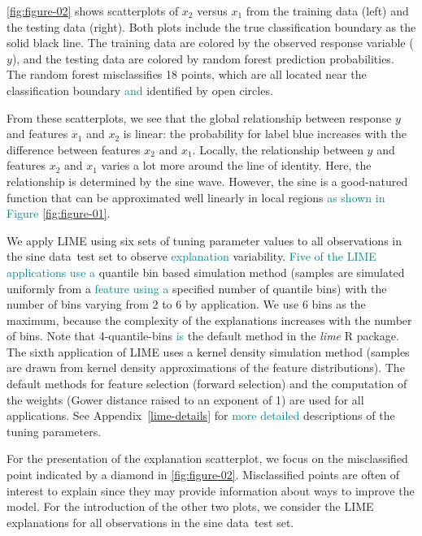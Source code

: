 \documentclass[AMS,STIX2COL]{WileyNJD-v2}\usepackage[]{graphicx}\usepackage[]{color}
\newcommand{\kge}[1]{\textcolor{teal}{#1}}
\newcommand{\data}{sine data}
\renewcommand{\sout}[1]{\unskip}
\begin{document}
\autoref{fig:figure-02} shows scatterplots of $x_2$ versus $x_1$ from the training data (left) and the testing data (right). Both plots include the true classification boundary \sout{of the rotated sine function plotted} as the solid black line. The training data are colored by the observed response variable ($y$), and the testing data are colored by random forest prediction probabilities. The random forest  misclassifies 18 points, which are all located near the classification boundary \sout{. These are} \kge{and} identified by open circles\sout{ in \autoref{fig:figure-02}}. 

From these scatterplots, we \sout{also} see that the global relationship between response $y$ and features $x_1$ and $x_2$ is linear: the probability for label blue increases with the difference between features $x_2$ and $x_1$. Locally, the relationship between $y$ and features $x_2$ and $x_1$ varies a lot more around the line of identity. Here, the relationship is determined by the sine wave. However, the sine is a good-natured function that can be approximated well linearly in local regions \kge{as shown in Figure \ref{fig:figure-01}}.

We apply LIME using six sets of tuning parameter values to all observations in the \data \ test set to observe \kge{explanation} variability\sout{ across tuning parameter values}. \kge{Five of the LIME applications use a} \sout{A} quantile bin based simulation method (samples are simulated uniformly from a \kge{feature using a} specified number of quantile bins) \sout{is used for five of the LIME applications} with the number of bins varying from 2 to 6 by application. We use 6 bins as the maximum, because the complexity of the explanations increases with the number of bins. Note that 4-quantile-bins \kge{is} \sout{are} the default method in the \emph{lime} R package. The sixth application of LIME uses a kernel density simulation method (samples are drawn from kernel density approximations of the feature distributions). The default methods for feature selection (forward selection) and the computation of the weights (Gower distance raised to an exponent of 1) are used for all applications. See Appendix~\ref{lime-details} for \kge{more detailed} descriptions of the tuning parameters.

For the presentation of the explanation scatterplot, we focus on the misclassified point \sout{with $(x_1, x_2, x_3)$ coordinates of (1.23, 8.47, -0.99)} indicated by a diamond in \autoref{fig:figure-02}. Misclassified points are often of interest to explain since they may provide information about ways to improve the model. For the introduction of the other two  plots, we consider the LIME explanations for  all observations in the \data \ test set.
\end{document}
